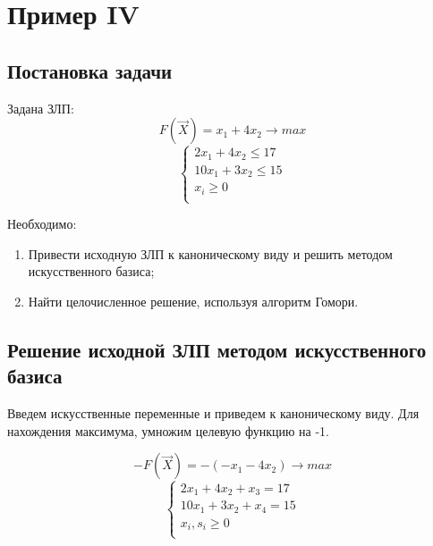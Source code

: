 \section{Пример IV}

\subsection{Постановка задачи}
\renewcommand{\labelenumi}{\arabic{enumi})}
Задана ЗЛП:
$$F(\vec{X}) = x_1+4x_2 \to max$$
\begin{equation}
\label{system}
\begin{cases}
2x_1+4x_2 \le 17\\
10x_1+3x_2 \le 15\\
x_i \ge 0 \\
\end{cases}
\end{equation}

Необходимо:
\begin{enumerate}
\item Привести исходную ЗЛП к каноническому виду и решить методом искусственного базиса;
\item Найти целочисленное решение, используя алгоритм Гомори.
\end{enumerate}

\subsection{Решение исходной ЗЛП методом искусственного базиса}
Введем искусственные переменные и приведем к каноническому виду.
Для нахождения максимума, умножим целевую функцию на -1.

$$-F(\vec{X}) = -(-x_1-4x_2) \to max$$
\begin{equation}
\label{cannonical}
\begin{cases}
2x_1+4x_2+x_3=17\\
10x_1+3x_2+x_4=15\\
x_i, s_i \ge 0 \\
\end{cases}
\end{equation}

